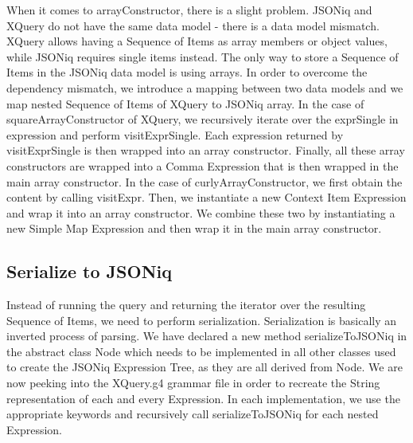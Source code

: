When it comes to arrayConstructor, there is a slight problem. JSONiq and XQuery do not have the same data model - there is a data model mismatch. XQuery allows having a Sequence of Items as array members or object values, while JSONiq requires single items instead. The only way to store a Sequence of Items in the JSONiq data model is using arrays. In order to overcome the dependency mismatch, we introduce a mapping between two data models and we map nested Sequence of Items of XQuery to JSONiq array. In the case of squareArrayConstructor of XQuery, we recursively iterate over the exprSingle in expression and perform visitExprSingle. Each expression returned by visitExprSingle is then wrapped into an array constructor. Finally, all these array constructors are wrapped into a Comma Expression that is then wrapped in the main array constructor. In the case of curlyArrayConstructor, we first obtain the content by calling visitExpr. Then, we instantiate a new Context Item Expression and wrap it into an array constructor. We combine these two by instantiating a new Simple Map Expression and then wrap it in the main array constructor.

\subsection{Serialize to JSONiq}
Instead of running the query and returning the iterator over the resulting Sequence of Items, we need to perform serialization. Serialization is basically an inverted process of parsing. We have declared a new method serializeToJSONiq in the abstract class Node which needs to be implemented in all other classes used to create the JSONiq Expression Tree, as they are all derived from Node. We are now peeking into the XQuery.g4 grammar file in order to recreate the String representation of each and every Expression. In each implementation, we use the appropriate keywords and recursively call serializeToJSONiq for each nested Expression. 

